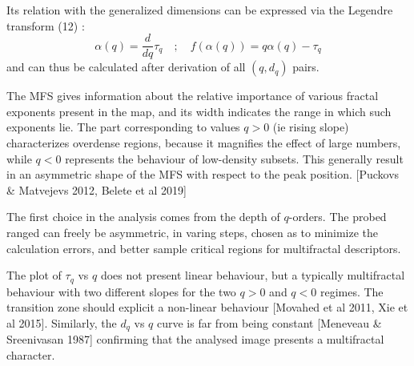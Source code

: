 Its relation with the generalized dimensions can be expressed via the Legendre transform (12) : 
\begin{equation}
    \alpha(q)=\frac{d}{dq}\tau_q \quad;\quad f(\alpha(q))=q\alpha(q)-\tau_q
\end{equation}
and can thus be calculated after derivation of all $(q,d_q)$ pairs. 

The MFS gives information about the relative importance of various fractal exponents present in the map, and its width indicates the range in which such exponents lie. The part corresponding to values $q>0$ (ie rising slope) characterizes overdense regions, because it magnifies the effect of large numbers, while $q<0$ represents the behaviour of low-density subsets. This generally result in an asymmetric shape of the MFS with respect to the peak position. [Puckovs \& Matvejevs 2012, Belete et al 2019]

The first choice in the analysis comes from the depth of $q$-orders. The probed ranged can freely be asymmetric, in varing steps, chosen as to minimize the calculation errors, and better sample critical regions for multifractal descriptors. 

The plot of $\tau_q$ vs $q$ does not present linear behaviour, but a typically multifractal behaviour with two different slopes for the two $q>0$ and $q<0$ regimes. The transition zone should explicit a non-linear behaviour [Movahed et al 2011, Xie et al 2015]. Similarly, the $d_q$ vs $q$ curve is far from being constant [Meneveau \& Sreenivasan 1987] confirming that the analysed image presents a multifractal character. 

